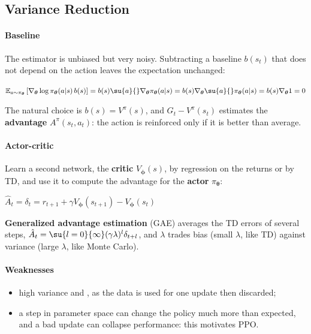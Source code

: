 \subsection{Variance Reduction}
\paragraph{Baseline} The estimator is unbiased but very noisy. Subtracting a baseline
$b(s_{t})$ that does not depend on the action leaves the expectation unchanged:
\begin{center}
    $\mathbb{E}_{a\sim\pi_{\bm{\theta}}}\left[\nabla_{\bm{\theta}}\log\pi_{\bm{\theta}}(a|s)
    \,b(s)\right]=b(s)\su{a}{}\nabla_{\bm{\theta}}\pi_{\bm{\theta}}(a|s)
    =b(s)\nabla_{\bm{\theta}}\su{a}{}\pi_{\bm{\theta}}(a|s)=b(s)\nabla_{\bm{\theta}}1=0$
\end{center}
The natural choice is $b(s)=V^{\pi}(s)$, and $G_{t}-V^{\pi}(s_{t})$ estimates the
\textbf{advantage} $A^{\pi}(s_{t},a_{t})$: the action is reinforced only if it is better than
average.

\paragraph{Actor-critic} Learn a second network, the \textbf{critic} $V_{\bm{\phi}}(s)$, by
regression on the returns or by TD, and use it to compute the advantage for the
\textbf{actor} $\pi_{\bm{\theta}}$:
\begin{center}
    $\hat{A}_{t}=\delta_{t}=r_{t+1}+\gamma V_{\bm{\phi}}(s_{t+1})-V_{\bm{\phi}}(s_{t})$
\end{center}
\textbf{Generalized advantage estimation} (GAE) averages the TD errors of several steps,
$\hat{A}_{t}=\su{l=0}{\infty}(\gamma\lambda)^{l}\delta_{t+l}$, and $\lambda$ trades bias
(small $\lambda$, like TD) against variance (large $\lambda$, like Monte Carlo).

\paragraph{Weaknesses}
\begin{itemize}
    \item high variance and , as the data is used for one update
        then discarded;
    \item a step in parameter space can change the policy much more than expected, and a
        bad update can collapse performance: this motivates PPO.
\end{itemize}
